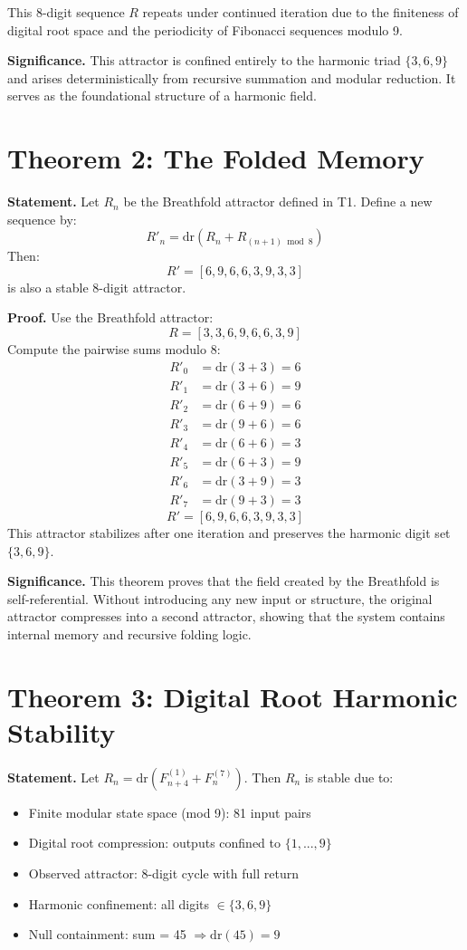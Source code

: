 \documentclass[12pt]{article}
\begin{document}
This 8-digit sequence \( R \) repeats under continued iteration due to the finiteness of digital root space and the periodicity of Fibonacci sequences modulo 9.

\textbf{Significance.} This attractor is confined entirely to the harmonic triad \(\{3, 6, 9\}\) and arises deterministically from recursive summation and modular reduction. It serves as the foundational structure of a harmonic field.

\section*{Theorem 2: The Folded Memory}
\textbf{Statement.} Let \( R_n \) be the Breathfold attractor defined in T1. Define a new sequence by:
\[
R'_n = \mathrm{dr}(R_n + R_{(n+1) \bmod 8})
\]
Then:
\[
R' = [6, 9, 6, 6, 3, 9, 3, 3]
\]
is also a stable 8-digit attractor.

\textbf{Proof.} Use the Breathfold attractor:
\[
R = [3, 3, 6, 9, 6, 6, 3, 9]
\]
Compute the pairwise sums modulo 8:
\begin{align*}
R'_0 &= \mathrm{dr}(3 + 3) = 6 \\
R'_1 &= \mathrm{dr}(3 + 6) = 9 \\
R'_2 &= \mathrm{dr}(6 + 9) = 6 \\
R'_3 &= \mathrm{dr}(9 + 6) = 6 \\
R'_4 &= \mathrm{dr}(6 + 6) = 3 \\
R'_5 &= \mathrm{dr}(6 + 3) = 9 \\
R'_6 &= \mathrm{dr}(3 + 9) = 3 \\
R'_7 &= \mathrm{dr}(9 + 3) = 3
\end{align*}
\[
R' = [6, 9, 6, 6, 3, 9, 3, 3]
\]
This attractor stabilizes after one iteration and preserves the harmonic digit set \(\{3, 6, 9\}\).

\textbf{Significance.} This theorem proves that the field created by the Breathfold is self-referential. Without introducing any new input or structure, the original attractor compresses into a second attractor, showing that the system contains internal memory and recursive folding logic.

\section*{Theorem 3: Digital Root Harmonic Stability}
\textbf{Statement.} Let \( R_n = \mathrm{dr}(F^{(1)}_{n+4} + F^{(7)}_n) \). Then \( R_n \) is stable due to:
\begin{itemize}
  \item Finite modular state space (mod 9): 81 input pairs
  \item Digital root compression: outputs confined to \(\{1, ..., 9\}\)
  \item Observed attractor: 8-digit cycle with full return
  \item Harmonic confinement: all digits \(\in \{3, 6, 9\}\)
  \item Null containment: sum = 45 \(\Rightarrow \mathrm{dr}(45) = 9\)
\end{itemize}
\end{document}
